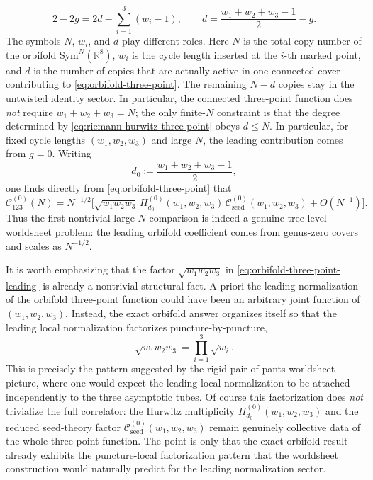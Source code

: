 \documentclass[11pt]{article}
\newcommand{\Sym}{\mathrm{Sym}}
\newcommand{\mc}[1]{\mathcal{#1}}
\newcommand{\bR}{\mathbb{R}}
\begin{document}
\begin{equation}\label{eq:riemann-hurwitz-three-point}
2-2g
=
2d-\sum_{i=1}^3 (w_i-1),
\qquad
d=\frac{w_1+w_2+w_3-1}{2}-g.
\end{equation}
The symbols $N$, $w_i$, and $d$ play different roles. Here $N$ is the total copy number of the orbifold $\Sym^N(\bR^8)$, $w_i$ is the cycle length inserted at the $i$-th marked point, and $d$ is the number of copies that are actually active in one connected cover contributing to \eqref{eq:orbifold-three-point}. The remaining $N-d$ copies stay in the untwisted identity sector. In particular, the connected three-point function does \emph{not} require $w_1+w_2+w_3=N$; the only finite-$N$ constraint is that the degree determined by \eqref{eq:riemann-hurwitz-three-point} obeys $d\le N$.
In particular, for fixed cycle lengths $(w_1,w_2,w_3)$ and large $N$, the leading contribution comes from $g=0$. Writing
\begin{equation}\label{eq:tree-level-degree}
d_0:=\frac{w_1+w_2+w_3-1}{2},
\end{equation}
one finds directly from \eqref{eq:orbifold-three-point} that
\begin{equation}\label{eq:orbifold-three-point-leading}
\mc C_{123}^{(0)}(N)
=
N^{-1/2}
\Big[
\sqrt{w_1w_2w_3}\,
H_{d_0}^{(0)}(w_1,w_2,w_3)\,
\mc C_{\mathrm{seed}}^{(0)}(w_1,w_2,w_3)
+O(N^{-1})
\Big].
\end{equation}
Thus the first nontrivial large-$N$ comparison is indeed a genuine tree-level worldsheet problem: the leading orbifold coefficient comes from genus-zero covers and scales as $N^{-1/2}$.

It is worth emphasizing that the factor $\sqrt{w_1w_2w_3}$ in \eqref{eq:orbifold-three-point-leading} is already a nontrivial structural fact. A priori the leading normalization of the orbifold three-point function could have been an arbitrary joint function of $(w_1,w_2,w_3)$. Instead, the exact orbifold answer organizes itself so that the leading local normalization factorizes puncture-by-puncture,
\[
\sqrt{w_1w_2w_3}=\prod_{i=1}^3 \sqrt{w_i}.
\]
This is precisely the pattern suggested by the rigid pair-of-pants worldsheet picture, where one would expect the leading local normalization to be attached independently to the three asymptotic tubes. Of course this factorization does \emph{not} trivialize the full correlator: the Hurwitz multiplicity $H_{d_0}^{(0)}(w_1,w_2,w_3)$ and the reduced seed-theory factor $\mc C_{\mathrm{seed}}^{(0)}(w_1,w_2,w_3)$ remain genuinely collective data of the whole three-point function. The point is only that the exact orbifold result already exhibits the puncture-local factorization pattern that the worldsheet construction would naturally predict for the leading normalization sector.
\end{document}
